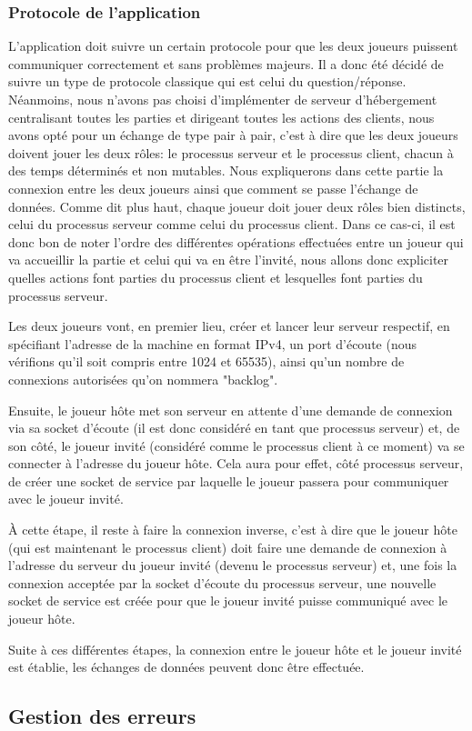 	\subsubsection{Protocole de l'application}
		L'application doit suivre un certain protocole pour que les deux joueurs puissent communiquer correctement et sans problèmes majeurs. Il a donc été décidé de suivre un type de protocole classique qui est celui du question/réponse. Néanmoins, nous n'avons pas choisi d'implémenter de serveur d'hébergement centralisant toutes les parties et dirigeant toutes les actions des clients, nous avons opté pour un échange de type pair à pair, c'est à dire que les deux joueurs doivent jouer les deux rôles: le processus serveur et le processus client, chacun à des temps déterminés et non mutables. \newline
		Nous expliquerons dans cette partie la connexion entre les deux joueurs ainsi que comment se passe l'échange de données.
			Comme dit plus haut, chaque joueur doit jouer deux rôles bien distincts, celui du processus serveur comme celui du processus client. Dans ce cas-ci, il est donc bon de noter l'ordre des différentes opérations effectuées entre un joueur qui va accueillir la partie et celui qui va en être l'invité, nous allons donc expliciter quelles actions font parties du processus client et lesquelles font parties du processus serveur. \newline
			
			Les deux joueurs vont, en premier lieu, créer et lancer leur serveur respectif, en spécifiant l'adresse de la machine en format IPv4, un port d'écoute (nous vérifions qu'il soit compris entre 1024 et 65535), ainsi qu'un nombre de connexions autorisées qu'on nommera "backlog". \newline
			
			Ensuite, le joueur hôte met son serveur en attente d'une demande de connexion via sa socket d'écoute (il est donc considéré en tant que processus serveur) et, de son côté, le joueur invité (considéré comme le processus client à ce moment) va se connecter à l'adresse du joueur hôte. Cela aura pour effet, côté processus serveur, de créer une socket de service par laquelle le joueur passera pour communiquer avec le joueur invité. \newline
			
			À cette étape, il reste à faire la connexion inverse, c'est à dire que le joueur hôte (qui est maintenant le processus client) doit faire une demande de connexion à l'adresse du serveur du joueur invité (devenu le processus serveur) et, une fois la connexion acceptée par la socket d'écoute du processus serveur, une nouvelle socket de service est créée pour que le joueur invité puisse communiqué avec le joueur hôte.\newline
			
			Suite à ces différentes étapes, la connexion entre le joueur hôte et le joueur invité est établie, les échanges de données peuvent donc être effectuée.


\subsection{Gestion des erreurs}
